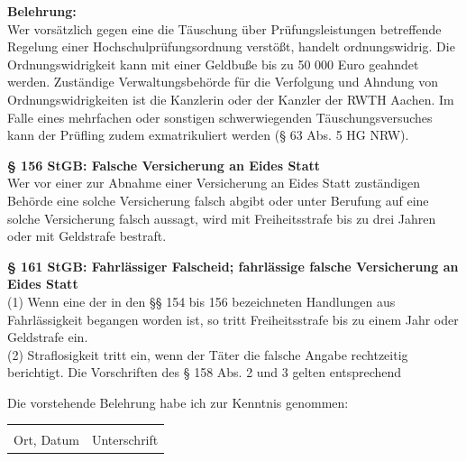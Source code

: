 \documentclass[12pt, a4paper, oneside]{article}
\begin{document}
	\vspace{0.6cm}

	\begin{small}
		\textbf{Belehrung:}\\
		Wer vorsätzlich gegen eine die Täuschung über Prüfungsleistungen betreffende Regelung einer Hochschulprüfungsordnung verstößt, handelt ordnungswidrig. Die Ordnungswidrigkeit kann mit einer Geldbuße bis zu 50 000 Euro geahndet werden. Zuständige Verwaltungsbehörde für die Verfolgung und Ahndung von Ordnungswidrigkeiten ist die Kanzlerin oder der Kanzler der RWTH Aachen. Im Falle eines mehrfachen oder sonstigen schwerwiegenden Täuschungsversuches kann der Prüfling zudem exmatrikuliert werden (§ 63 Abs. 5 HG NRW).
		
		\textbf{§ 156 StGB: Falsche Versicherung an Eides Statt}\\
		Wer vor einer zur Abnahme einer Versicherung an Eides Statt zuständigen Behörde eine solche Versicherung falsch abgibt oder unter Berufung auf eine solche Versicherung falsch aussagt, wird mit Freiheitsstrafe bis zu drei Jahren oder mit Geldstrafe bestraft.
		
		\textbf{§ 161 StGB: Fahrlässiger Falscheid; fahrlässige falsche Versicherung an Eides Statt}\\
		(1) Wenn eine der in den §§ 154 bis 156 bezeichneten Handlungen aus Fahrlässigkeit begangen worden ist, so tritt Freiheitsstrafe bis zu einem Jahr oder Geldstrafe ein.\\
		(2) Straflosigkeit tritt ein, wenn der Täter die falsche Angabe rechtzeitig berichtigt. Die Vorschriften des § 158 Abs. 2 und 3 gelten entsprechend
	\end{small}

	\vspace{0.6cm}
	
	Die vorstehende Belehrung habe ich zur Kenntnis genommen:
	
	\vspace{0.6cm}
	
	\begin{tabular}{@{}p{8cm}p{5.8cm}}
		\underline{\smash{Aachen, den \today}} & \underline{\hspace{5.8cm}}\\
		Ort, Datum & Unterschrift \\
	\end{tabular}
	
	\endgroup
	\clearpage
	
\end{document}
